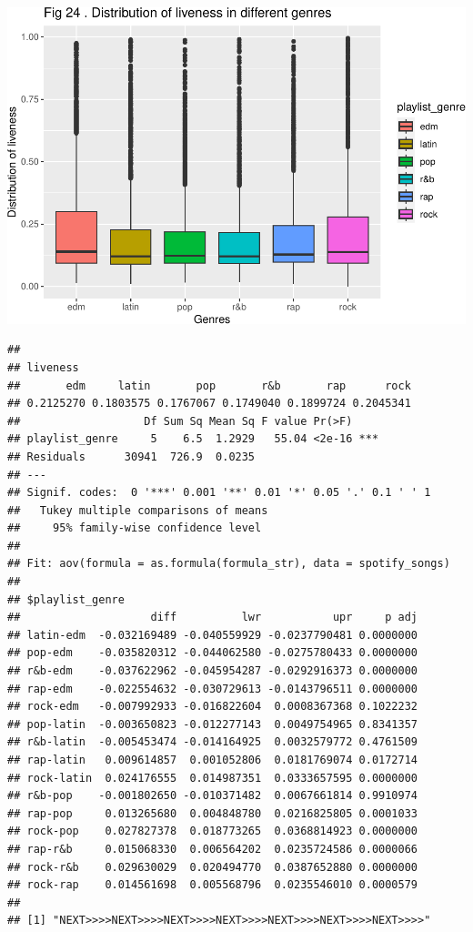 \documentclass[
]{article}
\begin{document}
\includegraphics{Final-Report_files/figure-latex/unnamed-chunk-14-20.pdf}

\begin{verbatim}
## 
## liveness
##       edm     latin       pop       r&b       rap      rock 
## 0.2125270 0.1803575 0.1767067 0.1749040 0.1899724 0.2045341 
##                   Df Sum Sq Mean Sq F value Pr(>F)    
## playlist_genre     5    6.5  1.2929   55.04 <2e-16 ***
## Residuals      30941  726.9  0.0235                   
## ---
## Signif. codes:  0 '***' 0.001 '**' 0.01 '*' 0.05 '.' 0.1 ' ' 1
##   Tukey multiple comparisons of means
##     95% family-wise confidence level
## 
## Fit: aov(formula = as.formula(formula_str), data = spotify_songs)
## 
## $playlist_genre
##                    diff          lwr           upr     p adj
## latin-edm  -0.032169489 -0.040559929 -0.0237790481 0.0000000
## pop-edm    -0.035820312 -0.044062580 -0.0275780433 0.0000000
## r&b-edm    -0.037622962 -0.045954287 -0.0292916373 0.0000000
## rap-edm    -0.022554632 -0.030729613 -0.0143796511 0.0000000
## rock-edm   -0.007992933 -0.016822604  0.0008367368 0.1022232
## pop-latin  -0.003650823 -0.012277143  0.0049754965 0.8341357
## r&b-latin  -0.005453474 -0.014164925  0.0032579772 0.4761509
## rap-latin   0.009614857  0.001052806  0.0181769074 0.0172714
## rock-latin  0.024176555  0.014987351  0.0333657595 0.0000000
## r&b-pop    -0.001802650 -0.010371482  0.0067661814 0.9910974
## rap-pop     0.013265680  0.004848780  0.0216825805 0.0001033
## rock-pop    0.027827378  0.018773265  0.0368814923 0.0000000
## rap-r&b     0.015068330  0.006564202  0.0235724586 0.0000066
## rock-r&b    0.029630029  0.020494770  0.0387652880 0.0000000
## rock-rap    0.014561698  0.005568796  0.0235546010 0.0000579
## 
## [1] "NEXT>>>>NEXT>>>>NEXT>>>>NEXT>>>>NEXT>>>>NEXT>>>>NEXT>>>>"
\end{verbatim}
\end{document}
